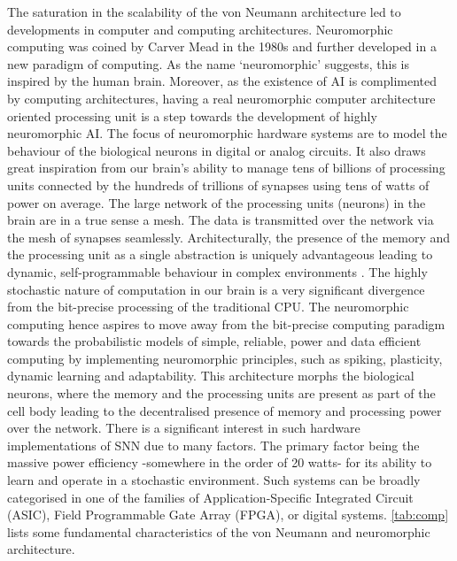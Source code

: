 The saturation in the scalability of the von Neumann architecture led to developments in computer and computing architectures. Neuromorphic computing was coined by Carver Mead \citep{mead1990neuromorphic} in the 1980s and further developed in a new paradigm of computing. As the name `neuromorphic' suggests, this is inspired by the human brain. Moreover, as the existence of AI is complimented by computing architectures, having a real neuromorphic computer architecture oriented processing unit is a step towards the development of highly neuromorphic AI. The focus of neuromorphic hardware systems are to model the behaviour of the biological neurons in digital or analog circuits. It also draws great inspiration from our brain's ability to manage tens of billions of processing units connected by the hundreds of trillions of synapses using tens of watts of power on average. The large network of the processing units (neurons) in the brain are in a true sense a mesh. The data is transmitted over the network via the mesh of synapses seamlessly. Architecturally, the presence of the memory and the processing unit as a single abstraction is uniquely advantageous leading to dynamic, self-programmable behaviour in complex environments \citep{schuller2016vonneumann}. The highly stochastic nature of computation in our brain is a very significant divergence from the bit-precise processing of the traditional CPU. The neuromorphic computing hence aspires to move away from the bit-precise computing paradigm towards the probabilistic models of simple, reliable, power and data efficient computing \citep{calimera2013human} by implementing neuromorphic principles, such as spiking, plasticity, dynamic learning and adaptability. This architecture morphs the biological neurons, where the memory and the processing units are present as part of the cell body leading to the decentralised presence of memory and processing power over the network. There is a significant interest in such hardware implementations of SNN due to many factors. The primary factor being the massive power efficiency -somewhere in the order of 20 watts- for its ability to learn and operate in a stochastic environment. Such systems can be broadly categorised in one of the families of Application-Specific Integrated Circuit (ASIC), Field Programmable Gate Array (FPGA), or digital systems. \tablename \ref{tab:comp} lists some fundamental characteristics of the von Neumann and neuromorphic architecture.

